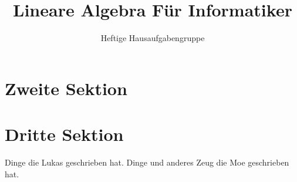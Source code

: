 \documentclass[12pt,a4paper]{article}
\author{Heftige Hausaufgabengruppe}
\title{Lineare Algebra Für Informatiker}
\begin{document}
\maketitle
\tableofcontents
\section{Zweite Sektion}
\section{Dritte Sektion}
Dinge die Lukas geschrieben hat.
Dinge und anderes Zeug die Moe geschrieben hat.
\end{document}
